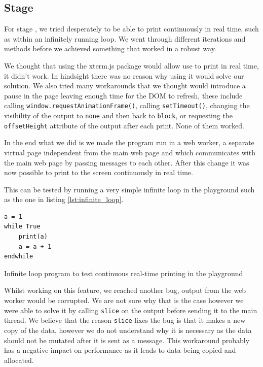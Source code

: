 \documentclass{article}
\newcommand{\subsecnum}{\the\value{subsection}}
\begin{document}
\subsection{Stage \subsecnum}

For stage \subsecnum, we tried desperately to be able to print continuously in
real time, such as within an infinitely running loop. We went through different
iterations and methods before we achieved something that worked in a robust
way.

We thought that using the xterm.js package would allow use to print in real
time, it didn't work. In hindsight there was no reason why using it would solve
our solution. We also tried many workarounds that we thought would introduce a
pause in the page leaving enough time for the DOM to refresh, these include
calling \texttt{window.requestAnimationFrame()}, calling
\texttt{setTimeout()}, changing the visibility of the output
to \texttt{none} and then back to \texttt{block}, or requesting the
\texttt{offsetHeight} attribute of the output after each print. None of them
worked.

In the end what we did is we made the program run in a web worker, a separate
virtual page independent from the main web page and which communicates with the
main web page by passing messages to each other. After this change it was now
possible to print to the screen continuously in real time.

This can be tested by running a very simple infinite loop in the playground
such as the one in listing \ref{lst:infinite_loop}.

\begin{listing}
	\begin{verbatim}
a = 1
while True
    print(a)
    a = a + 1
endwhile
	\end{verbatim}
	\caption{Infinite loop program to test continuous real-time printing in the
	playground}
	\label{lst:infinite_loop}
\end{listing}

Whilst working on this feature, we reached another bug, output from the web
worker would be corrupted. We are not sure why that is the case however we were
able to solve it by calling \texttt{slice} on the output before sending it to
the main thread. We believe that the reason \texttt{slice} fixes the bug is
that it makes a new copy of the data, however we do not understand why it is
necessary as the data should not be mutated after it is sent as a message. This
workaround probably has a negative impact on performance as it leads to data
being copied and allocated.
\end{document}
